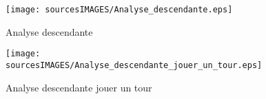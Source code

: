 \begin{figure}[ht]
  \centering
  \texttt{[image: sourcesIMAGES/Analyse\_descendante.eps]}
  \caption{Analyse descendante}
  \texttt{[image: sourcesIMAGES/Analyse\_descendante\_jouer\_un\_tour.eps]}
  \caption{Analyse descendante jouer un tour}
\end{figure}

